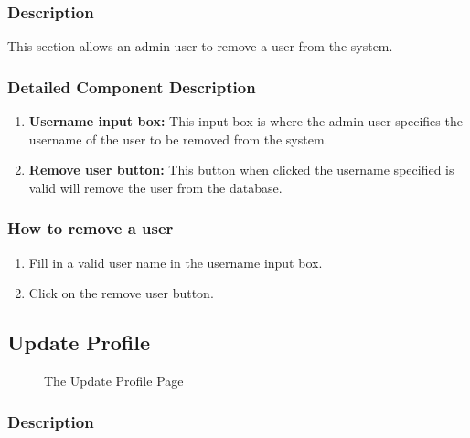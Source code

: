 \documentclass[14pt, a4paper]{article}
\begin{document}
\subsubsection{Description} This section allows an admin user to remove a user from the system.
\subsubsection{Detailed Component Description}
\begin{enumerate}
\item \textbf{Username input box:} This input box is where the admin user specifies the username of the user to be removed from the system.
\item \textbf{Remove user button:} This button when clicked the username specified is valid will remove the user from the database.
\end{enumerate}
\subsubsection{How to remove a user}
\begin{enumerate}
\item Fill in a valid user name in the username input box.
\item Click on the remove user button.
\end{enumerate}
\subsection{Update Profile}
\begin{figure}[H]
\centerline{}
\caption{The Update Profile Page}
\label{fig:updateProf1}
\end{figure}
\subsubsection{Description} 
\end{document}

